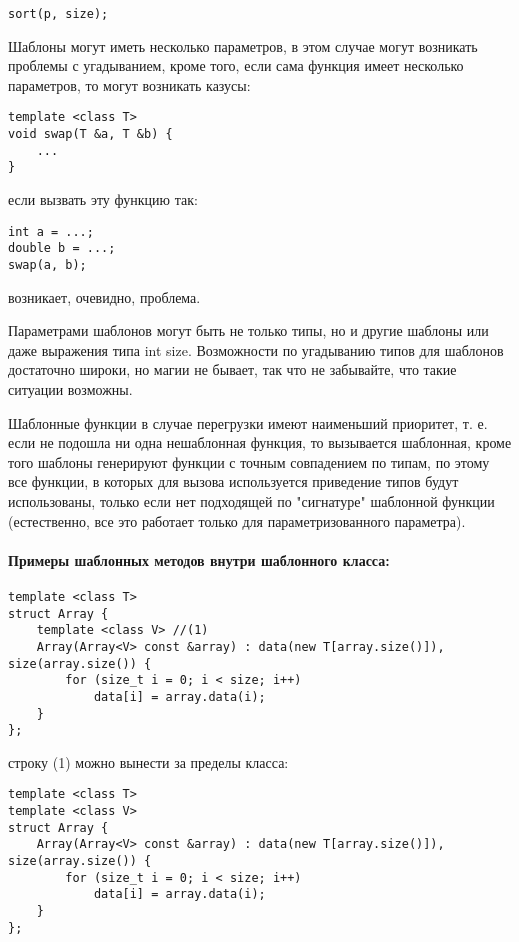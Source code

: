 \begin{lstlisting}
sort(p, size);
\end{lstlisting}

Шаблоны могут иметь несколько параметров, в этом случае могут возникать проблемы с угадыванием, кроме того, если сама функция имеет несколько параметров, то
могут возникать казусы:

\begin{lstlisting}
template <class T>
void swap(T &a, T &b) {
	...
}
\end{lstlisting}

если вызвать эту функцию так:

\begin{lstlisting}
int a = ...;
double b = ...;
swap(a, b);
\end{lstlisting}

возникает, очевидно, проблема.

Параметрами шаблонов могут быть не только типы, но и другие шаблоны или даже выражения типа int size. Возможности по угадыванию типов для шаблонов достаточно
широки, но магии не бывает, так что не забывайте, что такие ситуации возможны.

Шаблонные функции в случае перегрузки имеют наименьший приоритет, т. е. если не подошла ни одна нешаблонная функция, то вызывается шаблонная, кроме того шаблоны
генерируют функции с точным совпадением по типам, по этому все функции, в которых для вызова используется приведение типов будут использованы, только если нет
подходящей по "сигнатуре" шаблонной функции (естественно, все это работает только для параметризованного параметра).


\paragraph{Примеры шаблонных методов внутри шаблонного класса:}

\begin{lstlisting}
template <class T>
struct Array {
	template <class V> //(1)
	Array(Array<V> const &array) : data(new T[array.size()]), size(array.size()) {
		for (size_t i = 0; i < size; i++)
			data[i] = array.data(i);
	}
};
\end{lstlisting}

строку (1) можно вынести за пределы класса:

\begin{lstlisting}
template <class T>
template <class V>
struct Array {
	Array(Array<V> const &array) : data(new T[array.size()]), size(array.size()) {
		for (size_t i = 0; i < size; i++)
			data[i] = array.data(i);
	}
};
\end{lstlisting}

